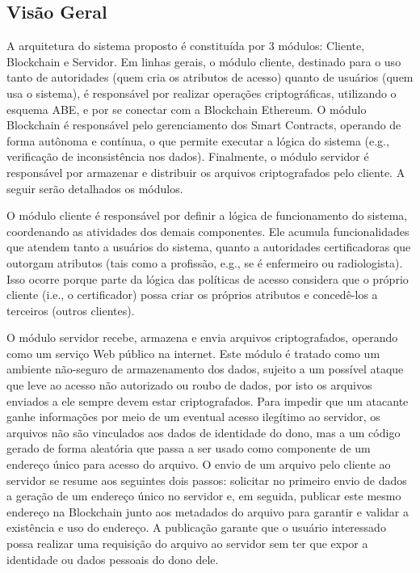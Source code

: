 \documentclass[a4paper,11pt]{article}
\begin{document}
\subsection{Visão Geral}
\label{sec:sub:visaogeral}


A arquitetura do sistema proposto é constituída por 3 módulos: Cliente, Blockchain e Servidor.  Em linhas gerais, o módulo cliente, %
destinado para o uso tanto de autoridades (quem cria os atributos de acesso) quanto de usuários (quem usa o sistema), é responsável por %
realizar operações criptográficas, utilizando o esquema ABE, e por se conectar com a Blockchain Ethereum.
O módulo Blockchain é responsável pelo gerenciamento dos Smart Contracts, operando de forma autônoma e contínua, o que permite executar a lógica do sistema (e.g., verificação de inconsistência nos dados).
Finalmente, o módulo servidor é responsável por armazenar e distribuir os arquivos criptografados pelo cliente.
A seguir serão detalhados os módulos.


O módulo cliente é responsável por definir a lógica de funcionamento do sistema, coordenando as atividades dos demais componentes.
Ele acumula funcionalidades que atendem tanto a usuários do sistema, quanto a autoridades certificadoras que outorgam atributos (tais como a profissão, e.g., se é enfermeiro ou radiologista).
Isso ocorre porque parte da lógica das políticas de acesso considera que o próprio cliente (i.e., o certificador) possa criar os próprios atributos e concedê-los a terceiros (outros clientes).

O módulo servidor recebe, armazena e envia arquivos criptografados, operando como um serviço Web público na internet.
Este módulo é tratado como um ambiente não-seguro de armazenamento dos dados, sujeito a um possível ataque que leve ao acesso não autorizado ou roubo de dados, por isto os arquivos enviados a ele sempre devem estar criptografados.
Para impedir que um atacante ganhe informações por meio de um eventual acesso ilegítimo ao servidor, os arquivos não são vinculados aos dados de identidade do dono, mas a um código gerado de forma aleatória que passa a ser usado como componente de um endereço único para acesso do arquivo.
O envio de um arquivo pelo cliente ao servidor se resume aos seguintes dois passos:
solicitar no primeiro envio de dados a geração de um endereço único no servidor e, em seguida, publicar este mesmo endereço na Blockchain junto aos metadados do arquivo para garantir e validar a existência e uso do endereço.
A publicação garante que o usuário interessado possa realizar uma requisição do arquivo ao servidor sem ter que expor a identidade ou dados pessoais do dono dele.
\end{document}
